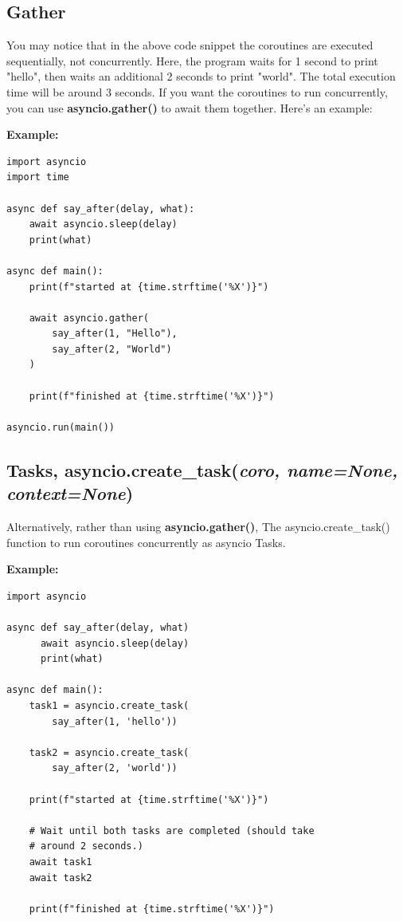 \documentclass{report}
\begin{document}
    \pagebreak \bigbreak \noindent
    \subsection{Gather}
    \bigbreak \noindent 
    You may notice that in the above code snippet the coroutines are executed sequentially, not concurrently.
    \bigbreak \noindent 
    Here, the program waits for 1 second to print "hello", then waits an additional 2 seconds to print "world". The total execution time will be around 3 seconds.
    \bigbreak \noindent 
    If you want the coroutines to run concurrently, you can use \textbf{asyncio.gather()} to await them together. Here's an example:

    \bigbreak \noindent 
    \begin{mdframed}
      \textbf{Example:}
      \begin{verbatim}
import asyncio
import time

async def say_after(delay, what):
    await asyncio.sleep(delay)
    print(what)

async def main():
    print(f"started at {time.strftime('%X')}")

    await asyncio.gather(
        say_after(1, "Hello"),
        say_after(2, "World")
    )

    print(f"finished at {time.strftime('%X')}")

asyncio.run(main())
      \end{verbatim}
      
    \end{mdframed}

    \pagebreak \bigbreak \noindent
    \subsection{Tasks, \textbf{asyncio.create\_task(\textit{coro, name=None, context=None})}}
    \bigbreak \noindent 
    Alternatively, rather than using \textbf{asyncio.gather()}, The asyncio.create\_task() function to run coroutines concurrently as asyncio Tasks.
    \bigbreak \noindent 
    \begin{mdframed}
      \textbf{Example: }
      \begin{verbatim}
import asyncio

async def say_after(delay, what)
      await asyncio.sleep(delay)
      print(what)

async def main():
    task1 = asyncio.create_task(
        say_after(1, 'hello'))

    task2 = asyncio.create_task(
        say_after(2, 'world'))

    print(f"started at {time.strftime('%X')}")

    # Wait until both tasks are completed (should take
    # around 2 seconds.)
    await task1
    await task2

    print(f"finished at {time.strftime('%X')}")
      \end{verbatim}
    \end{mdframed}
\end{document}
